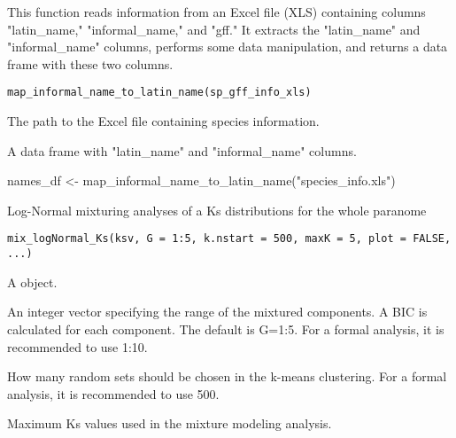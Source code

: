 \documentclass[a4paper]{book}
\begin{document}
%
\begin{Description}\relax
This function reads information from an Excel file (XLS) containing columns "latin\_name," "informal\_name," and "gff." It extracts the "latin\_name" and "informal\_name" columns, performs some data manipulation, and returns a data frame with these two columns.
\end{Description}
%
\begin{Usage}
\begin{verbatim}
map_informal_name_to_latin_name(sp_gff_info_xls)
\end{verbatim}
\end{Usage}
%
\begin{Arguments}
\begin{ldescription}
\item[\code{sp\_gff\_info\_xls}] The path to the Excel file containing species information.
\end{ldescription}
\end{Arguments}
%
\begin{Value}
A data frame with "latin\_name" and "informal\_name" columns.
\end{Value}
%
\begin{Examples}
\begin{ExampleCode}
names_df <- map_informal_name_to_latin_name("species_info.xls")
\end{ExampleCode}
\end{Examples}
%
\begin{Description}\relax
Log-Normal mixturing analyses of a Ks distributions for the whole paranome
\end{Description}
%
\begin{Usage}
\begin{verbatim}
mix_logNormal_Ks(ksv, G = 1:5, k.nstart = 500, maxK = 5, plot = FALSE, ...)
\end{verbatim}
\end{Usage}
%
\begin{Arguments}
\begin{ldescription}
\item[\code{ksv}] A  object.

\item[\code{G}] An integer vector specifying the range of the mixtured components.
A BIC is calculated for each component. The default is G=1:5.
For a formal analysis, it is recommended to use 1:10.

\item[\code{k.nstart}] How many random sets should be chosen in the k-means
clustering.
For a formal analysis, it is recommended to use 500.

\item[\code{maxK}] Maximum Ks values used in the mixture modeling analysis.
\end{ldescription}
\end{Arguments}
\end{document}
